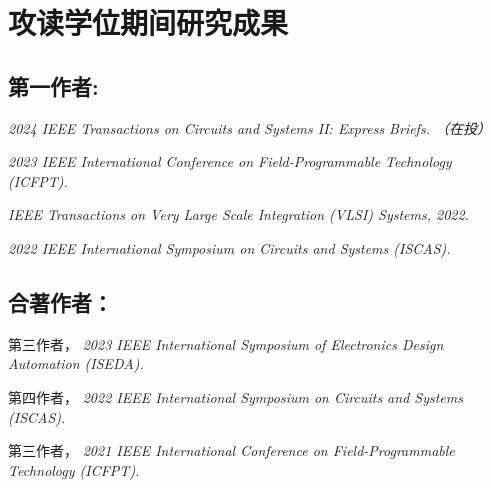 \chapter{攻读学位期间研究成果}

\ifdefined\Blind
\section*{第一作者:}
\begin{enumerate}[label={[\arabic*]}]
  \item \textit{2024 IEEE Transactions on Circuits and Systems II: Express Briefs. （在投）}
  \item \textit{2023 IEEE International Conference on Field-Programmable Technology (ICFPT).}
  \item \textit{IEEE Transactions on Very Large Scale Integration (VLSI) Systems, 2022.}
  \item \textit{2022 IEEE International Symposium on Circuits and Systems (ISCAS).}
\end{enumerate}

\vspace{5pt}
\section*{合著作者：}
\begin{enumerate}[label={[\arabic*]}]
  \item 第三作者， \textit{2023 IEEE  International Symposium of Electronics Design Automation (ISEDA).}
  \item 第四作者， \textit{2022 IEEE International Symposium on Circuits and Systems (ISCAS).}
  \item 第三作者， \textit{2021 IEEE International Conference on Field-Programmable Technology (ICFPT).}
\end{enumerate}

\else

